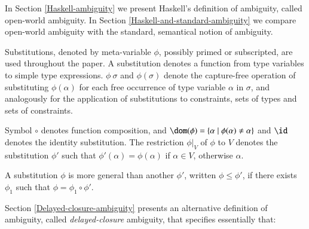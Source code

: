 \documentclass[review]{elsarticle}
\begin{document}
In Section \ref{Haskell-ambiguity} we present Haskell's definition of
ambiguity, called open-world ambiguity. In Section
\ref{Haskell-and-standard-ambiguity} we compare open-world ambiguity
with the standard, semantical notion of ambiguity.

Substitutions, denoted by meta-variable $\phi$, possibly primed or
subscripted, are used throughout the paper. A substitution denotes a
function from type variables to simple type
expressions. $\phi\:\sigma$ and $\phi(\sigma)$ denote the capture-free
operation of substituting $\phi(\alpha)$ for each free occurrence of
type variable $\alpha$ in $\sigma$, and analogously for the
application of substitutions to constraints, sets of types and sets of
constraints.

Symbol $\circ$ denotes function composition, and $\dom(\phi)=\{\alpha
\mid \phi(\alpha)\not=\alpha\}$ and $\id$ denotes the identity
substitution.  The restriction $\phi|_V$ of $\phi$ to $V$ denotes the
substitution $\phi'$ such that $\phi'(\alpha) = \phi(\alpha)$ if
$\alpha\in V$, otherwise $\alpha$.

A substitution $\phi$ is more general than another $\phi'$, written
$\phi\leq \phi'$, if there exists $\phi_1$ such that $\phi = \phi_1
\circ \phi'$.

Section \ref{Delayed-closure-ambiguity} presents an alternative
definition of ambiguity, called {\em delayed-closure\/} ambiguity,
that specifies essentially that:
\end{document}
